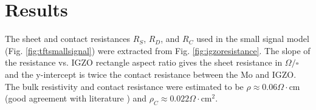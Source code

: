 \documentclass[conference]{IEEEtran}
\begin{document}
\section{Results}

The sheet and contact resistances $R_S$, $R_D$, and $R_C$ used in the small signal model (Fig. \ref{fig:tftsmallsignal}) were extracted from Fig. \ref{fig:igzoresistance}.
The slope of the resistance vs. IGZO rectangle aspect ratio gives the sheet resistance in $\Omega/\square$ and the y-intercept is twice the contact resistance between the Mo and IGZO.
The bulk resistivity and contact resistance were estimated to be $\rho \approx 0.06\Omega\cdot$cm (good agreement with literature \cite{Hsu}) and $\rho_C \approx 0.022\Omega\cdot$cm$^2$.

\begin{figure}[h!]
    \centering
    \quad
\end{figure}
\end{document}
